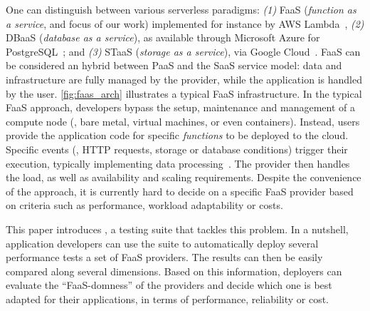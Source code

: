 One can distinguish between various serverless paradigms:
\emph{(1)} FaaS (\emph{function as a service}, and focus of our work) implemented for instance by \gls{AWS} Lambda~\cite{AWSLambda},
\emph{(2)} DBaaS (\emph{database as a service}), as available through Microsoft Azure for PostgreSQL~\cite{AzureDBaaS}; and
\emph{(3)} STaaS (\emph{storage as a service}), via Google Cloud~\cite{serverlessgoogle}. 
FaaS can be considered an hybrid between \gls{PaaS} and the \gls{SaaS} service model: data and infrastructure are fully managed by the provider, while the application is handled by the user.
\autoref{fig:faas_arch} illustrates a typical FaaS infrastructure.
In the typical FaaS approach, developers bypass the setup, maintenance and management of a compute node (\ie, bare metal, virtual machines, or even containers). %
Instead, users provide the application code for specific \emph{functions} to be deployed to the cloud.
Specific events (\eg, \gls{HTTP} requests, storage or database conditions) trigger their execution, typically implementing data processing~\cite{AWSLambda, GoogleFunctions}.
The provider then handles the load, as well as availability and scaling requirements. %
Despite the convenience of the approach, it is currently hard to decide on a specific FaaS provider based on criteria such as performance, workload adaptability or costs.

This paper introduces \sys, a testing suite that tackles this problem.
In a nutshell, application developers can use the \sys suite to automatically deploy several performance tests a set of FaaS providers.
The results can then be easily compared along several dimensions.
Based on this information, deployers can evaluate the ``FaaS-domness'' of the providers and decide which one is best adapted for their applications, in terms of performance, reliability or cost.

